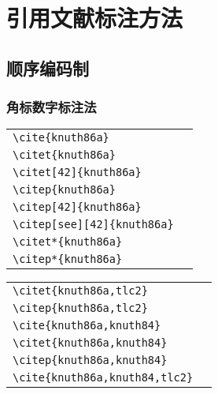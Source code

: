 \chapter{引用文献标注方法}

\section{顺序编码制}

\subsection{角标数字标注法}

\noindent
\begin{tabular}{l@{\quad$\Rightarrow$\quad}l}
  \verb|\cite{knuth86a}|              & \cite{knuth86a}              \\
  \verb|\citet{knuth86a}|             & \citet{knuth86a}             \\
  \verb|\citet[42]{knuth86a}|         & \citet[42]{knuth86a}         \\
  \verb|\citep{knuth86a}|             & \citep{knuth86a}             \\
  \verb|\citep[42]{knuth86a}|         & \citep[42]{knuth86a}         \\
  \verb|\citep[see][42]{knuth86a}|    & \citep[see][42]{knuth86a}    \\
  \verb|\citet*{knuth86a}|            & \citet*{knuth86a}            \\
  \verb|\citep*{knuth86a}|            & \citep*{knuth86a}            \\
\end{tabular}
\par{}
\noindent
\begin{tabular}{l@{\quad$\Rightarrow$\quad}l}
  \verb|\citet{knuth86a,tlc2}|        & \citet{knuth86a,tlc2}        \\
  \verb|\citep{knuth86a,tlc2}|        & \citep{knuth86a,tlc2}        \\
  \verb|\cite{knuth86a,knuth84}|      & \cite{knuth86a,knuth84}      \\
  \verb|\citet{knuth86a,knuth84}|     & \citet{knuth86a,knuth84}     \\
  \verb|\citep{knuth86a,knuth84}|     & \citep{knuth86a,knuth84}     \\
  \verb|\cite{knuth86a,knuth84,tlc2}| & \cite{knuth86a,knuth84,tlc2} \\
\end{tabular}



